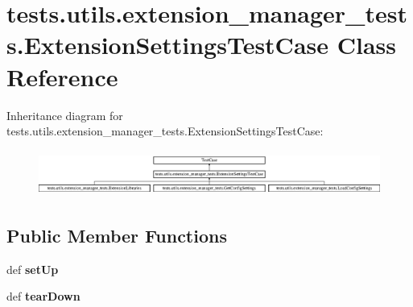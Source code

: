 \hypertarget{classtests_1_1utils_1_1extension__manager__tests_1_1ExtensionSettingsTestCase}{\section{tests.\+utils.\+extension\+\_\+manager\+\_\+tests.\+Extension\+Settings\+Test\+Case Class Reference}
\label{classtests_1_1utils_1_1extension__manager__tests_1_1ExtensionSettingsTestCase}
}
Inheritance diagram for tests.\+utils.\+extension\+\_\+manager\+\_\+tests.\+Extension\+Settings\+Test\+Case\+:\begin{figure}[H]
\begin{center}
\leavevmode
\includegraphics[height=1.513514cm]{classtests_1_1utils_1_1extension__manager__tests_1_1ExtensionSettingsTestCase}
\end{center}
\end{figure}
\subsection*{Public Member Functions}
\begin{DoxyCompactItemize}
\item 
\hypertarget{classtests_1_1utils_1_1extension__manager__tests_1_1ExtensionSettingsTestCase_ada7b1ab0d0fe85c3a38392c0305aa3a5}{def {\bfseries set\+Up}}\label{classtests_1_1utils_1_1extension__manager__tests_1_1ExtensionSettingsTestCase_ada7b1ab0d0fe85c3a38392c0305aa3a5}

\item 
\hypertarget{classtests_1_1utils_1_1extension__manager__tests_1_1ExtensionSettingsTestCase_a16facc5e00ba98e9410c3e8d2c42bb89}{def {\bfseries tear\+Down}}\label{classtests_1_1utils_1_1extension__manager__tests_1_1ExtensionSettingsTestCase_a16facc5e00ba98e9410c3e8d2c42bb89}

\end{DoxyCompactItemize}
